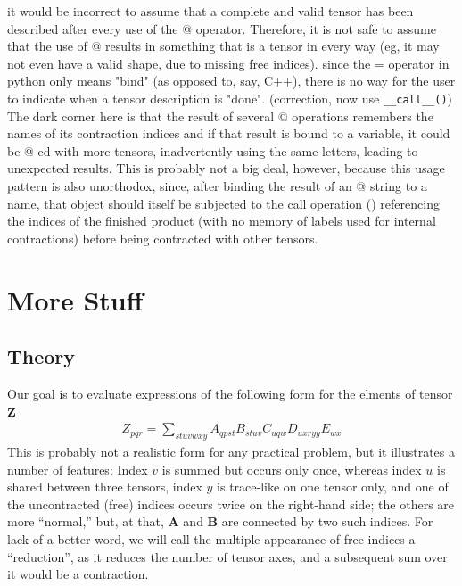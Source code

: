 \documentclass[12pt,letterpaper]{article}
\begin{document}
it would be incorrect to assume that a complete and
valid tensor has been described after every use of the @ operator.  Therefore, it is not
safe to assume that the use of @ results in something that is a tensor in every way
(eg, it may not even have a valid shape, due to missing free indices).
since the = operator in python only means "bind" (as opposed to, say, C++), there is no
way for the user to indicate when a tensor description is "done".
(correction, now use \texttt{\_\_call\_\_()})
  The dark corner here
is that the result of several @ operations remembers the names of its contraction indices
and if that result is bound to a variable, it could be @-ed with more tensors, inadvertently
using the same letters, leading to unexpected results.  This is probably not a big deal,
however, because this usage pattern is also unorthodox, since, after binding the result
of an @ string to a name, that object should itself be subjected to the call operation ()
referencing the indices of the finished product (with no memory of labels used for internal
contractions) before being contracted with other tensors.

		\section{More Stuff}

	\subsection{Theory}

Our goal is to evaluate expressions of the following form for the elments
 of tensor $\mathbf{Z}$
\begin{eqnarray}
  \label{horrible_tensor}
  Z_{pqr} = \sum_{stuvwxy} A_{qpst} B_{stuv} C_{uqw} D_{uxryy} E_{wx}
\end{eqnarray}
This is probably not a realistic form for any practical problem,
 but it illustrates a number of features:
Index $v$ is summed but occurs only once, whereas index $u$ is shared
 between three tensors, index $y$ is trace-like on one tensor only,
 and one of the uncontracted (free) indices occurs twice on the right-hand side;
 the others are more ``normal,'' but, at that, $\mathbf{A}$ and $\mathbf{B}$
 are connected by two such indices.
For lack of a better word, we will call the multiple appearance of free indices
 a ``reduction'', as it reduces the number of tensor axes, and a subsequent
 sum over it would be a contraction.
\end{document}
